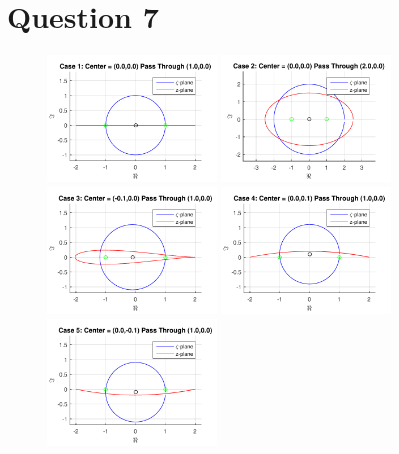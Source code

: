 \documentclass[letterpaper,12pt,]{article}
\begin{document}
\section*{Question 7}
\begin{figure}[h!]
  \centering
  \includegraphics[width=0.40\textwidth]{case1}
  \includegraphics[width=0.40\textwidth]{case2}
  \includegraphics[width=0.40\textwidth]{case3}
  \includegraphics[width=0.40\textwidth]{case4}
  \includegraphics[width=0.40\textwidth]{case5}

\end{figure}
\end{document}
